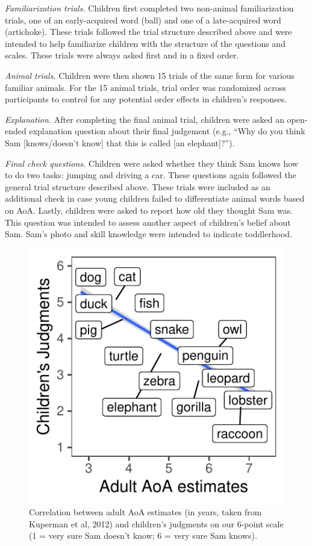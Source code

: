 \documentclass[10pt, letterpaper]{article}
\newenvironment{CodeChunk}{}{}
\begin{document}
\emph{Familiarization trials.} Children first completed two non-animal
familiarization trials, one of an early-acquired word (ball) and one of
a late-acquired word (artichoke). These trials followed the trial
structure described above and were intended to help familiarize children
with the structure of the questions and scales. These trials were always
asked first and in a fixed order.

\emph{Animal trials.} Children were then shown 15 trials of the same
form for various familiar animals. For the 15 animal trials, trial order
was randomized across participants to control for any potential order
effects in children's responses.

\emph{Explanation.} After completing the final animal trial, children
were asked an open-ended explanation question about their final
judgement (e.g., ``Why do you think Sam {[}knows/doesn't know{]} that
this is called {[}an elephant{]}?'').

\emph{Final check questions.} Children were asked whether they think Sam
knows how to do two tasks: jumping and driving a car. These questions
again followed the general trial structure described above. These trials
were included as an additional check in case young children failed to
differentiate animal words based on AoA. Lastly, children were asked to
report how old they thought Sam was. This question was intended to
assess another aspect of children's belief about Sam. Sam's photo and
skill knowledge were intended to indicate toddlerhood.

\begin{CodeChunk}
\begin{figure}[tb]
\includegraphics{figs/overall-1} \caption[Correlation between adult AoA estimates (in years, taken from Kuperman et al, 2012) and children’s judgments on our 6-point scale (1 = very sure Sam doesn’t know]{Correlation between adult AoA estimates (in years, taken from Kuperman et al, 2012) and children’s judgments on our 6-point scale (1 = very sure Sam doesn’t know; 6 = very sure Sam knows).}\label{fig:overall}
\end{figure}
\end{CodeChunk}
\end{document}
